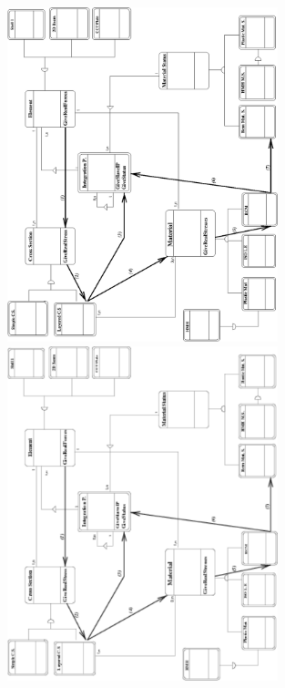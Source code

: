 \documentclass[a4paper]{article}
\begin{document}
\begin{figure}[tb]
\begin{htmlonly}
  \centerline{\includegraphics[width=0.7\textwidth]{struct1.eps}}
\end{htmlonly}
\ifpdf
\centerline{\includegraphics[angle=270, width=0.7\textwidth]{struct1.pdf}}
\else

\end{figure}
\end{document}
